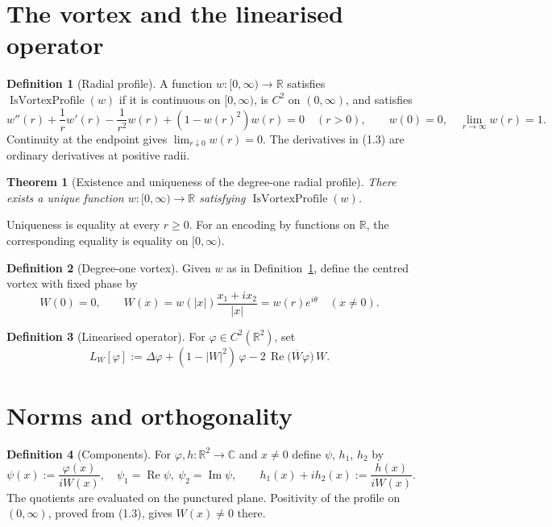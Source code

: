 \documentclass[11pt]{amsart}
\newtheorem{profiletheorem}{Theorem}
\theoremstyle{definition}
\newtheorem{definition}{Definition}[section]
\newcommand{\C}{\mathbb{C}}
\newcommand{\R}{\mathbb{R}}
\renewcommand{\Re}{\operatorname{Re}}
\renewcommand{\Im}{\operatorname{Im}}
\newcommand{\vprofile}{\operatorname{IsVortexProfile}}
\begin{document}
\section{The vortex and the linearised operator}\label{sec:profile}

\begin{definition}[Radial profile]\label{def:profile}
A function $w\colon[0,\infty)\to\R$ satisfies $\vprofile(w)$ if it is
continuous on $[0,\infty)$, is $C^2$ on $(0,\infty)$, and satisfies
\begin{equation*}
  w''(r)+\frac{1}{r}w'(r)-\frac{1}{r^2}w(r)+(1-w(r)^2)w(r)=0
  \quad(r>0),\qquad
  w(0)=0,\quad \lim_{r\to\infty}w(r)=1. \tag{1.3}
\end{equation*}
Continuity at the endpoint gives $\lim_{r\downarrow0}w(r)=0$. The derivatives
in (1.3) are ordinary derivatives at positive radii.
\end{definition}

\begin{profiletheorem}[Existence and uniqueness of the degree-one radial profile]\label{thm:profile}
There exists a unique function $w\colon[0,\infty)\to\R$ satisfying $\vprofile(w)$.
\end{profiletheorem}

Uniqueness is equality at every $r\ge0$. For an encoding by functions on $\R$,
the corresponding equality is equality on $[0,\infty)$.

\begin{definition}[Degree-one vortex]\label{def:vortex}
Given $w$ as in Definition~\ref{def:profile}, define the centred vortex with fixed phase by
\[
   W(0)=0,\qquad W(x)=w(|x|)\frac{x_1+i x_2}{|x|}
       =w(r)e^{i\theta}\quad (x\ne0).
\]
\end{definition}

\begin{definition}[Linearised operator]
For $\varphi \in C^2(\R^2)$, set
\[
  L_W[\varphi] := \Delta\varphi + (1 - |W|^2)\,\varphi
      - 2\,\Re\bigl(\overline{W}\varphi\bigr)\,W. \tag{1.5}
\]
\end{definition}

\section{Norms and orthogonality}\label{sec:norms}

\begin{definition}[Components]
For $\varphi, h \colon \R^2 \to \C$ and $x \neq 0$ define $\psi$, $h_1$, $h_2$ by
\[
  \psi(x) := \frac{\varphi(x)}{iW(x)}, \quad \psi_1 = \Re\psi,\ \psi_2 = \Im\psi, \qquad
  h_1(x) + i h_2(x) := \frac{h(x)}{iW(x)}.
\]
The quotients are evaluated on the punctured plane. Positivity of the profile
on $(0,\infty)$, proved from (1.3), gives $W(x)\ne0$ there.
\end{definition}
\end{document}
